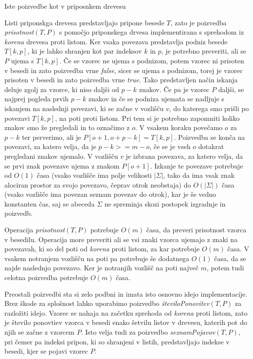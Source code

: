 Iste poizvedbe kot v priposnkem drevesu

Listi priponskga drevesa predstavljajo pripone besede $T$, zato je poizvedba \textit{prisotnost}$(T,P)$ s pomočjo priponskega drvesa implementirana s sprehodom iz \textit{korena} drevesa proti listom. Ker vsaka povezava predstavlja podniz besede $T[k,p]$, ki je lahko shranjen kot par indeksov $k$ in $p$, je potrebno preveriti, ali se $P$ ujema s $T[k,p]$. Če se vzorec ne ujema s podnizom, potem vzorec ni prisoten v besedi in zato poizvedba vrne \textit{false}, sicer se ujema s podnizom, torej je vzorec prisoten v besedi in zato poizvedba vrne \textit{true}. Tako predstavljen način iskanja deluje zgolj za vzorce, ki niso daljši od $p-k$ znakov. Če pa je vzorec $P$ daljši, se najprej pogleda prvih $p-k$ znakov in če se podniza ujemata se nadljuje s iskanjem na naslednji povezavi, ki se začne v vozlišču $v$, do katerega smo prišli po povezavi $T[k,p]$, na poti proti listom. Pri tem si je potrebno zapomniti koliko znakov smo že pregledali in to označimo z $o$. V vsakem koraku povečamo $o$ za $p-k$ ter perverimo, ali je $P[o+1,o+p-k]=T[k,p]$. Poizvedba se konča na povezavi, za katero velja, da je $p-k>=m-o$, če se je vseh $o$ dotakrat pregledani znakov ujemalo. V vozlišču $v$ je izbrana povezava, za katero velja, da se prvi znak povezave ujema z znakom $P[o+1]$. Izkanje te povezave potrebuje od $O(1)$ časa (vsako vozlišče ima polje velikosti $|\Sigma|$, tako da ima vsak znak alociran prostor za svojo povezavo, čeprav otrok neobstaja) do $O(|\Sigma|)$ časa (vsako vozlišče ima povezan seznam povezav do otrok), kar je še vedno konstanten čas, saj se abeceda $\Sigma$ ne spreminja skozi postopek izgradnje in poizvedb.

Operacija \textit{prisotnost}$(T,P)$ potrebuje $O(m)$ časa, da preveri prisotnost vzorca v besedilu. Operacija more preveriti ali se vsi znaki vzorca ujemajo z znaki na povezavah, ki so del poti od \textit{korena} proti listom, za kar potrebuje $O(m)$ časa. V vsakem notranjem vozlišču na poti pa potrebuje še dodatnega $O(1)$ časa, da se najde naslednjo povezavo. Ker je notranjih vozlišč na poti največ $m$, potem tudi celotna poizvedba potrebuje $O(m)$ časa.


Preostali poizvedbi sta si zelo podbni in imata isto osnovno idejo implementacije. Brez škode za splošnost lahko uporabimo poizvedbo \textit{številoPonovitev}$(T,P)$ za razložiti idejo. Vzorec se nahaja na začetku sprehoda od \textit{korena} proti listom, zato je število ponovtiev vzorca v besedi enako šetvilu listov v drevesu, katerih pot do njih se začne z vzorcem $P$. Isto velja tudi za poizvedbo \textit{seznamPojavov}$(T,P)$, pri čemer pa indeksi pripon, ki so shranjeni v listih, predstavljajo indekse v besedi, kjer se pojavi vzorec $P$.

